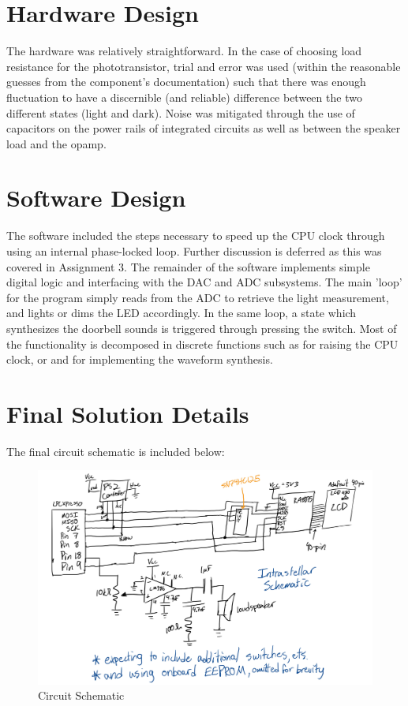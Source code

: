 \documentclass[a4paper, 12pt]{article}
\begin{document}
\section*{Hardware Design}
The hardware was relatively straightforward. In the case of choosing load resistance for the phototransistor, trial and error was used (within the reasonable guesses from the component's documentation) such that there was enough fluctuation to have a discernible (and reliable) difference between the two different states (light and dark). Noise was mitigated through the use of capacitors on the power rails of integrated circuits as well as between the speaker load and the opamp. 

\section*{Software Design}
The software included the steps necessary to speed up the CPU clock through using an internal phase-locked loop. Further discussion is deferred as this was covered in Assignment 3. The remainder of the software implements simple digital logic and interfacing with the DAC and ADC subsystems. The main 'loop' for the program simply reads from the ADC to retrieve the light measurement, and lights or dims the LED accordingly. In the same loop, a state which synthesizes the doorbell sounds is triggered through pressing the switch. Most of the functionality is decomposed in discrete functions such as  for raising the CPU clock, or  and  for implementing the waveform synthesis. 

\section*{Final Solution Details}
The final circuit schematic is included below: 
\begin{figure}[h!]
  \centering
  \includegraphics[scale=.2]{schematic.png}
  \caption{Circuit Schematic}
  \label{fig:schematic}
\end{figure}
\end{document}
